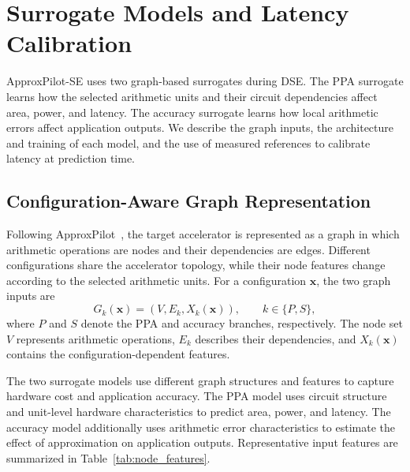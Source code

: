 
\section{Surrogate Models and Latency Calibration}
\label{sec:surrogate_models}

ApproxPilot-SE uses two graph-based surrogates during DSE. The PPA surrogate learns how the selected arithmetic units and their circuit dependencies affect area, power, and latency. The accuracy surrogate learns how local arithmetic errors affect application outputs. We describe the graph inputs, the architecture and training of each model, and the use of measured references to calibrate latency at prediction time.

\subsection{Configuration-Aware Graph Representation}
\label{subsec:surrogate_graph_representation}

Following ApproxPilot~\cite{zhang2025approxpilot}, the target accelerator is represented as a graph in which arithmetic operations are nodes and their dependencies are edges. Different configurations share the accelerator topology, while their node features change according to the selected arithmetic units. For a configuration $\mathbf{x}$, the two graph inputs are
\begin{equation}
    G_k(\mathbf{x})
    =
    (V,E_k,X_k(\mathbf{x})),
    \qquad k\in\{P,S\},
    \label{eq:se_graph}
\end{equation}
where $P$ and $S$ denote the PPA and accuracy branches, respectively. The node set $V$ represents arithmetic operations, $E_k$ describes their dependencies, and $X_k(\mathbf{x})$ contains the configuration-dependent features.

The two surrogate models use different graph structures and features to capture hardware cost and application accuracy. The PPA model uses circuit structure and unit-level hardware characteristics to predict area, power, and latency. The accuracy model additionally uses arithmetic error characteristics to estimate the effect of approximation on application outputs. Representative input features are summarized in Table~\ref{tab:node_features}.


